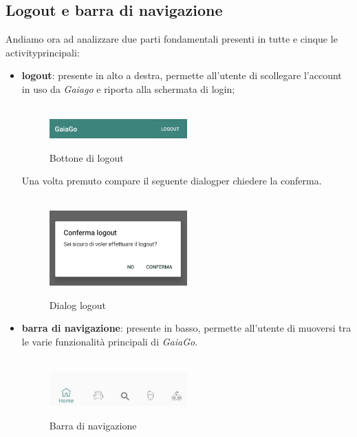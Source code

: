 \subsection{Logout e barra di navigazione}
Andiamo ora ad analizzare due parti fondamentali presenti in tutte e cinque le activity\glosp principali:
\begin{itemize}
	\item \textbf{logout}: presente in alto a destra, permette all'utente di scollegare l'account in uso da \textit{Gaiago} e riporta alla schermata di login;
	\\\\
	  \begin{figure}[H] 
	 	\centering 
	 	\includegraphics[width=0.5\textwidth]{res/images/logout.png}\\
	 	\caption{Bottone di logout}
	 	\label{Login button}
	 \end{figure}
 Una volta premuto compare il seguente dialog\glosp per chiedere la conferma.
 \\\\
 \begin{figure}[H] 
 	\centering 
 	\includegraphics[width=0.5\textwidth]{res/images/logout_press.png}\\
 	\caption{Dialog logout}
 	\label{Logout_press}
 \end{figure}
 	\item  \textbf{barra di navigazione}: presente in basso, permette all'utente di muoversi tra le varie funzionalità principali di \textit{GaiaGo}.
 	\\\\
 	  \begin{figure}[H] 
 	  	\centering 
 	  	\includegraphics[width=0.5\textwidth]{res/images/barra_navigazione.jpg}\\
 	  	\caption{Barra di navigazione}
 	  	\label{Barra di navigazione}
 	  \end{figure}
\end{itemize}
\pagebreak
